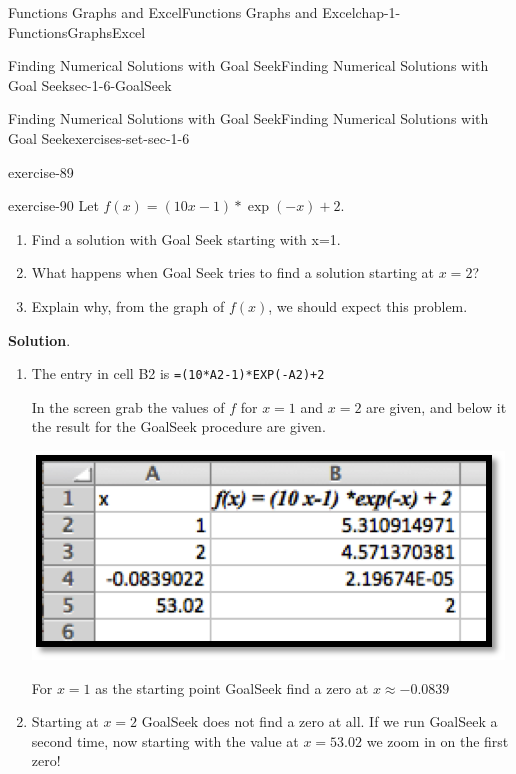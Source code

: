 \documentclass[oneside,10pt,]{book}
\newcommand{\mono}[1]{\texttt{#1}}
\numberwithin{equation}{section}
\begin{document}
\begin{chapterptx}{Functions Graphs and Excel}{}{Functions Graphs and Excel}{}{}{chap-1-FunctionsGraphsExcel}
\begin{sectionptx}{Finding Numerical Solutions with Goal Seek}{}{Finding Numerical Solutions with Goal Seek}{}{}{sec-1-6-GoalSeek}
\begin{exercises-subsection-numberless}{Finding Numerical Solutions with Goal Seek}{}{Finding Numerical Solutions with Goal Seek}{}{}{exercises-set-sec-1-6}
\begin{divisionexercise}{14}{}{}{exercise-89}
\end{divisionexercise}%
\begin{divisionexercise}{15}{}{}{exercise-90}%
\hypertarget{p-535}{}%
Let \(f(x) = (10 x-1) *\exp(-x) + 2\).%
\leavevmode%
\begin{enumerate}[label=(\alph*)]
\item\hypertarget{li-153}{}\hypertarget{p-536}{}%
Find a solution with Goal Seek starting with x=1.%
\item\hypertarget{li-154}{}\hypertarget{p-537}{}%
What happens when Goal Seek tries to find a solution starting at \(x=2\)?%
\item\hypertarget{li-155}{}\hypertarget{p-538}{}%
Explain why, from the graph of \(f(x)\), we should expect this problem.%
\end{enumerate}
\par\smallskip%
\noindent\textbf{Solution}.\hypertarget{solution-43}{}\quad%
\leavevmode%
\begin{enumerate}[label=(\alph*)]
\item\hypertarget{li-156}{}\hypertarget{p-539}{}%
The entry in cell B2 is \mono{=(10*A2-1)*EXP(-A2)+2}%
\par
\hypertarget{p-540}{}%
In the screen grab the values of \(f\) for \(x = 1\) and \(x = 2\) are given, and below it the result for the GoalSeek procedure are given. \begin{sidebyside}{1}{0.25}{0.25}{0}%
\begin{sbspanel}{0.5}%
\includegraphics[width=1\linewidth]{images/sec1-6-sol15a.png}
\end{sbspanel}%
\end{sidebyside}%
 For \(x = 1\) as the starting point GoalSeek find a zero at \(x\approx-0.0839\)%
\item\hypertarget{li-157}{}\hypertarget{p-541}{}%
Starting at \(x = 2\) GoalSeek does not find a zero at all. If we run GoalSeek a second time, now starting with the value at \(x = 53.02\) we zoom in on the first zero!%

\end{enumerate}
\end{divisionexercise}
\end{exercises-subsection-numberless}
\end{sectionptx}
\end{chapterptx}
\end{document}
